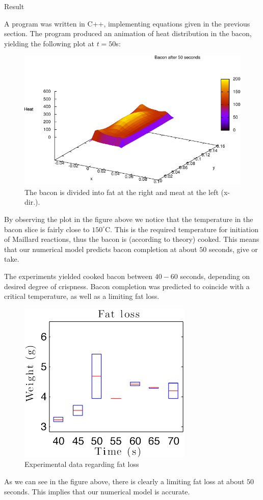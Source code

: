 \documentclass[final,hyperref={pdfpagelabels=false}]{beamer}
\begin{document}
\begin{frame}
\begin{columns}[t]
\begin{column}{1\textwidth}
\begin{multicols}{2}
\vspace{0.5\baselineskip}
{\Large Result}

A program was written in C++, implementing equations given in the previous
section. The program produced an animation of heat distribution in the bacon, 
yielding the following plot at $t = 50$s:
\begin{figure}[!h] 
  \begin{center}
    \includegraphics[width=0.6\linewidth]{bacon-50sec.pdf}
  \end{center}
  \caption{The bacon is divided into fat at the right and meat at the left (x-dir.).}
  \label{fig:bacon-50sec}
\end{figure}
By observing the plot in the figure above we notice that the
temperature in the bacon slice is fairly close to $150^{\circ}$C. This is the required temperature
for initiation of Maillard reactions, thus the bacon is (according to theory)
cooked. This means that our numerical model predicts bacon completion at about
$50$ seconds, give or take.

\vspace{0.5\baselineskip}	
The experiments yielded cooked bacon between $40-60$ seconds, depending on
desired degree of crispness. Bacon completion was predicted to coincide with a
critical temperature, as well as a limiting fat loss.
\begin{figure}[!h] 
  \begin{center}
    \includegraphics[width=0.5\linewidth]{poster_bacon.pdf}
  \end{center}
  \caption{Experimental data regarding fat loss}
  \label{fig:bacon-50sec}
\end{figure}
As we can see in the figure above, there is clearly a limiting fat loss at about
$50$ seconds. This implies that our numerical model is accurate.


\end{multicols}
\end{column}
\end{columns}
\end{frame}
\end{document}
